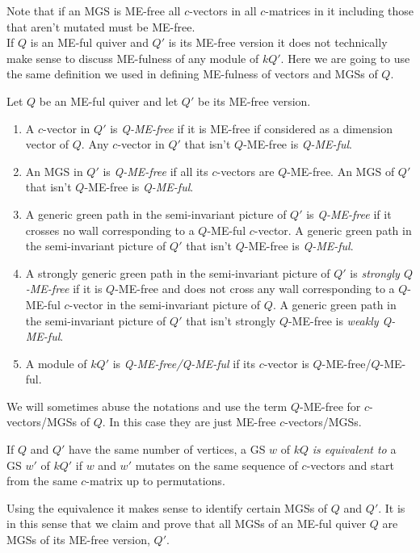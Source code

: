 \indent Note that if an MGS is ME-free all $c$-vectors in all $c$-matrices in it including those that aren't mutated must be ME-free.\\
\indent If $Q$ is an ME-ful quiver and $Q'$ is its ME-free version it does not technically make sense to discuss ME-fulness of any module of $kQ'$. Here we are going to use the same definition we used in defining ME-fulness of vectors and MGSs of $Q$.
\begin{definition}
Let $Q$ be an ME-ful quiver and let $Q'$ be its ME-free version.
\begin{enumerate}
\item A $c$-vector in $Q'$ is \textit{Q-ME-free} if it is ME-free if considered as a dimension vector of $Q$. Any $c$-vector in $Q'$ that isn't $Q$-ME-free is \textit{Q-ME-ful}.
\item An MGS in $Q'$ is \textit{Q-ME-free} if all its $c$-vectors are $Q$-ME-free. An MGS of $Q'$ that isn't $Q$-ME-free is \textit{Q-ME-ful}.
\item A generic green path in the semi-invariant picture of $Q'$ is \textit{Q-ME-free} if it crosses no wall corresponding to a $Q$-ME-ful $c$-vector. A generic green path in the semi-invariant picture of $Q'$ that isn't $Q$-ME-free is \textit{Q-ME-ful}.
\item A strongly generic green path in the semi-invariant picture of $Q'$ is \textit{strongly $Q$-ME-free} if it is $Q$-ME-free and does not cross any wall corresponding to a $Q$-ME-ful $c$-vector in the semi-invariant picture of $Q$. A generic green path in the semi-invariant picture of $Q'$ that isn't strongly $Q$-ME-free is \textit{weakly Q-ME-ful}.
\item A module of $kQ'$ is \textit{Q-ME-free/Q-ME-ful} if its $c$-vector is $Q$-ME-free/$Q$-ME-ful.
\end{enumerate}
\end{definition}
\indent We will sometimes abuse the notations and use the term $Q$-ME-free for $c$-vectors/MGSs of $Q$. In this case they are just ME-free $c$-vectors/MGSs.
\begin{definition}
If $Q$ and $Q'$ have the same number of vertices, a GS $w$ of $kQ$ \textit{is equivalent to} a GS $w'$ of $kQ'$ if $w$ and $w'$ mutates on the same sequence of $c$-vectors and start from the same $c$-matrix up to permutations. 
\end{definition}
\indent Using the equivalence it makes sense to identify certain MGSs of $Q$ and $Q'$. It is in this sense that we claim and prove that all MGSs of an ME-ful quiver $Q$ are MGSs of its ME-free version, $Q'$.\\

